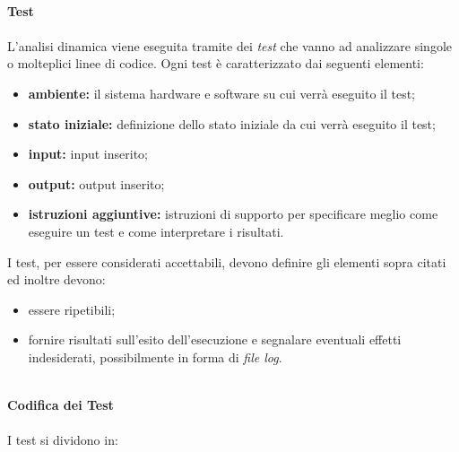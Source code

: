 \mbox{}\\
\textbf{Test} \mbox{}\\ \mbox{}\\
L'analisi dinamica viene eseguita tramite dei \textit{test} che vanno ad analizzare singole o molteplici linee di codice. Ogni test è caratterizzato dai seguenti elementi:
\begin{itemize}
	\item \textbf{ambiente: } il sistema hardware e software su cui verrà eseguito il test;
	\item \textbf{stato iniziale:} definizione dello stato iniziale da cui verrà eseguito il test;
	\item \textbf{input: } input inserito;
	\item \textbf{output: } output inserito;
	\item \textbf{istruzioni aggiuntive: } istruzioni di supporto per specificare meglio come eseguire un test e come interpretare i risultati.
\end{itemize}
I test, per essere considerati accettabili, devono definire gli elementi sopra citati ed inoltre devono:
\begin{itemize}
	\item essere ripetibili;
	\item fornire risultati sull'esito dell'esecuzione e segnalare eventuali effetti indesiderati, possibilmente in forma di \textit{file log}. 
\end{itemize}
\mbox{}\\
\textbf{Codifica dei Test} \mbox{}\\ \mbox{}\\
I test si dividono in:
